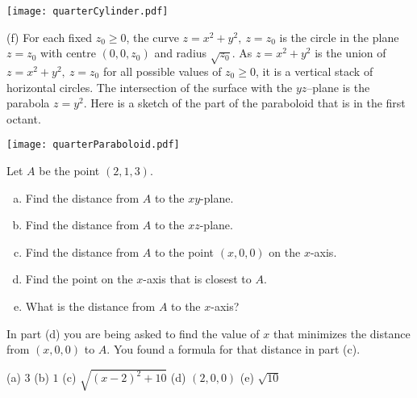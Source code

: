 \begin{solution}
\begin{center}
     \texttt{[image: quarterCylinder.pdf]}
\end{center}


(f)
For each fixed $z_0\ge 0$, the curve $z = x^2 + y^2,\ z=z_0$ is the circle in the plane $z=z_0$ with centre $(0,0,z_0)$ and radius $\sqrt{z_0}$. As 
$z = x^2 + y^2$ is the union of $z = x^2 + y^2,\ z=z_0$ for all 
possible values of $z_0\ge 0$, it is  a vertical stack of horizontal circles.
The intersection of the surface with the $yz$--plane is the parabola
$z=y^2$.  Here is a sketch of the part of the paraboloid that is in the 
first octant.

\begin{center}
     \texttt{[image: quarterParaboloid.pdf]}
\end{center}


\end{solution}

\begin{question}
Let $A$ be the point $(2,1,3)$.
\begin{enumerate}[(a)]
\item
Find the distance from $A$ to the $xy$-plane.
\item
Find the distance from $A$ to the $xz$-plane.
\item
Find the distance from $A$ to the point $(x,0,0)$ on the $x$-axis.
\item
Find the point on the $x$-axis that is closest to $A$.
\item
What is the distance from $A$ to the $x$-axis?
\end{enumerate}
\end{question}

\begin{hint}
In part (d) you are being asked to find the value of $x$ that minimizes the 
distance from $(x,0,0)$ to $A$. You found a formula for that distance in part (c).
\end{hint}

\begin{answer}
(a) $3$ \quad
(b) $1$ \quad
(c) $\sqrt{(x-2)^2 + 10}$ \quad
(d) $(2,0,0)$ \quad
(e) $\sqrt{10}$
\end{answer}

